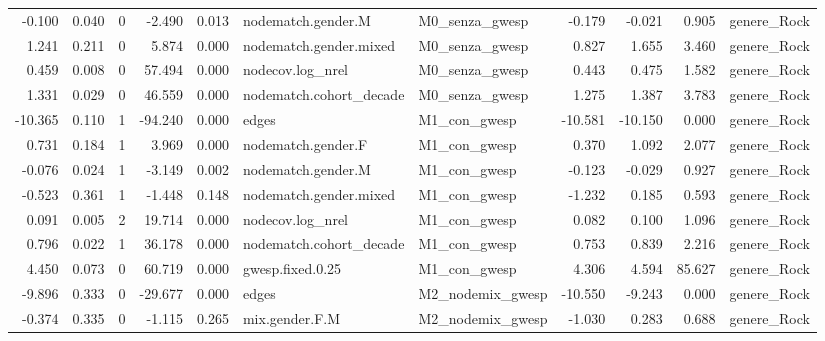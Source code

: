\begin{table}
\begin{tabular}{rrrrrllrrrl}
   -0.100 & 0.040 &        0 &   -2.490 &     0.013 &      nodematch.gender.M &   M0\_senza\_gwesp &  -0.179 &  -0.021 &   0.905 &                 genere\_Rock \\
    1.241 & 0.211 &        0 &    5.874 &     0.000 &  nodematch.gender.mixed &   M0\_senza\_gwesp &   0.827 &   1.655 &   3.460 &                 genere\_Rock \\
    0.459 & 0.008 &        0 &   57.494 &     0.000 &        nodecov.log\_nrel &   M0\_senza\_gwesp &   0.443 &   0.475 &   1.582 &                 genere\_Rock \\
    1.331 & 0.029 &        0 &   46.559 &     0.000 & nodematch.cohort\_decade &   M0\_senza\_gwesp &   1.275 &   1.387 &   3.783 &                 genere\_Rock \\
  -10.365 & 0.110 &        1 &  -94.240 &     0.000 &                   edges &     M1\_con\_gwesp & -10.581 & -10.150 &   0.000 &                 genere\_Rock \\
    0.731 & 0.184 &        1 &    3.969 &     0.000 &      nodematch.gender.F &     M1\_con\_gwesp &   0.370 &   1.092 &   2.077 &                 genere\_Rock \\
   -0.076 & 0.024 &        1 &   -3.149 &     0.002 &      nodematch.gender.M &     M1\_con\_gwesp &  -0.123 &  -0.029 &   0.927 &                 genere\_Rock \\
   -0.523 & 0.361 &        1 &   -1.448 &     0.148 &  nodematch.gender.mixed &     M1\_con\_gwesp &  -1.232 &   0.185 &   0.593 &                 genere\_Rock \\
    0.091 & 0.005 &        2 &   19.714 &     0.000 &        nodecov.log\_nrel &     M1\_con\_gwesp &   0.082 &   0.100 &   1.096 &                 genere\_Rock \\
    0.796 & 0.022 &        1 &   36.178 &     0.000 & nodematch.cohort\_decade &     M1\_con\_gwesp &   0.753 &   0.839 &   2.216 &                 genere\_Rock \\
    4.450 & 0.073 &        0 &   60.719 &     0.000 &        gwesp.fixed.0.25 &     M1\_con\_gwesp &   4.306 &   4.594 &  85.627 &                 genere\_Rock \\
   -9.896 & 0.333 &        0 &  -29.677 &     0.000 &                   edges & M2\_nodemix\_gwesp & -10.550 &  -9.243 &   0.000 &                 genere\_Rock \\
   -0.374 & 0.335 &        0 &   -1.115 &     0.265 &          mix.gender.F.M & M2\_nodemix\_gwesp &  -1.030 &   0.283 &   0.688 &                 genere\_Rock \\

\end{tabular}
\end{table}
